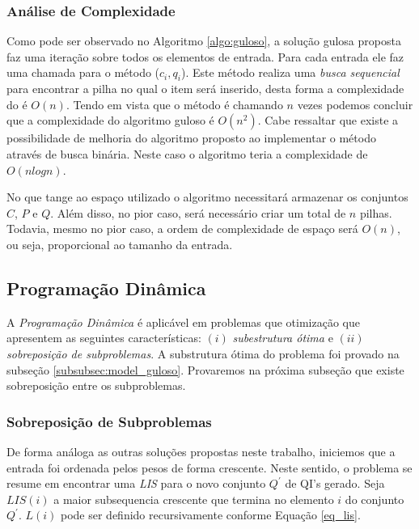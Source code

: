 \documentclass[12pt]{article}
\begin{document}
\subsubsection{Análise de Complexidade}
\label{subsubsec:greedy_analise_complexidade}

Como pode ser observado no Algoritmo \ref{algo:guloso}, a solução gulosa proposta faz uma iteração sobre todos os elementos de entrada. Para cada entrada ele faz uma chamada para o método \textsc{\GREEDYCHOICE($c_i,q_i$)}{}. Este método realiza uma \textit{busca sequencial} para encontrar a pilha no qual o item será inserido, desta forma a complexidade do \textsc{\GREEDYCHOICE} é $O(n)$. Tendo em vista que o método é chamando $n$ vezes podemos concluir que a complexidade do algoritmo guloso é $O(n^{2})$. Cabe ressaltar que existe a possibilidade de melhoria do algoritmo proposto ao implementar o método \textsc{\GREEDYCHOICE} através de busca binária. Neste caso o algoritmo teria a complexidade de $O(nlogn)$.

No que tange ao espaço utilizado o algoritmo necessitará armazenar os conjuntos $C$, $P$ e $Q$. Além disso, no pior caso, será necessário criar um total de $n$ pilhas. Todavia, mesmo no pior caso, a ordem de complexidade de espaço será $O(n)$, ou seja, proporcional ao tamanho da entrada.

\subsection{Programação Dinâmica}
\label{subsec:pd}

A \textit{Programação Dinâmica} é aplicável em problemas que otimização que apresentem as seguintes características: $(i)$ \textit{subestrutura ótima} e $(ii)$ \textit{sobreposição de subproblemas}. A substrutura ótima do problema foi provado na subseção \ref{subsubsec:model_guloso}. Provaremos na próxima subseção que existe sobreposição entre os subproblemas.


\subsubsection{Sobreposição de Subproblemas}
\label{subsubsec:sobreposicao}

De forma análoga as outras soluções propostas neste trabalho, iniciemos que a entrada foi ordenada pelos pesos de forma crescente. Neste sentido, o problema se resume em encontrar uma \textit{LIS} para o novo conjunto $Q^{'}$ de QI's gerado. Seja $LIS(i)$ a maior subsequencia crescente que termina no elemento $i$ do conjunto $Q^{'}$. $L(i)$ pode ser definido recursivamente conforme Equação \ref{eq_lis}{}.
\end{document}
